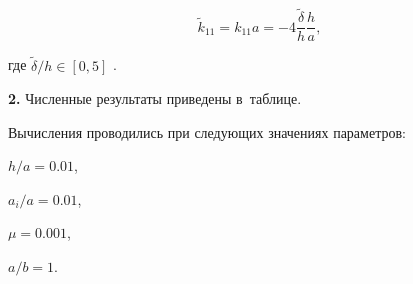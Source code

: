 \begin{equation*}

\tilde{k}_{11}=k_{11} a=-4\frac{\tilde{\delta}}{h}\frac{h}{a},

\end{equation*}

где ${\tilde{\delta}}/{h}\in[0, 5]$ \cite{myl-bib:33, myl-bib:34}.



\smallskip



{\bf 2.} Численные результаты приведены в~таблице. 

Вычисления проводились при следующих значениях параметров: 

${h}/{a}=0.01$, 

${a_i}/{a}=0.01$, 

$\mu=0.001$, 

${a}/{b}=1$.





